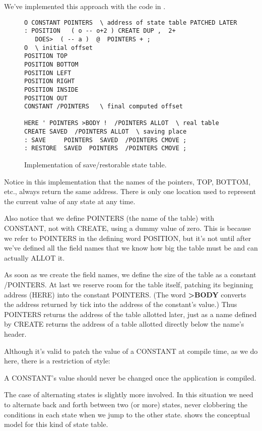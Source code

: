 

We've implemented this approach with the code in .

\begin{figure*}[tttt]
\caption{Implementation of save/restorable state table.}
\begin{center}
\begin{BVerbatim}
O CONSTANT POINTERS  \ address of state table PATCHED LATER
: POSITION   ( o -- o+2 ) CREATE DUP ,  2+
   DOES>  ( -- a )  @  POINTERS + ;
O  \ initial offset
POSITION TOP
POSITION BOTTOM
POSITION LEFT
POSITION RIGHT
POSITION INSIDE
POSITION OUT
CONSTANT /POINTERS   \ final computed offset

HERE ' POINTERS >BODY !  /POINTERS ALLOT  \ real table
CREATE SAVED  /POINTERS ALLOT  \ saving place
: SAVE     POINTERS  SAVED  /POINTERS CMOVE ;
: RESTORE  SAVED  POINTERS  /POINTERS CMOVE ;
\end{BVerbatim}
\end{center}
\end{figure*}

Notice in this implementation that the names of the pointers, TOP,
BOTTOM, etc., always return the same address. There is only one location
used to represent the current value of any state at any time.

Also notice that we define POINTERS (the name of the table) with
CONSTANT, not with CREATE, using a dummy value of zero. This is
because we refer to POINTERS in the defining word POSITION, but it's
not until after we've defined all the field names that we know how big the
table must be and can actually ALLOT it.

As soon as we create the field names, we define the size of the table
as a constant /POINTERS. At last we reserve room for the table itself,
patching its beginning address (HERE) into the constant POINTERS.
(The word \textbf{>BODY} converts the address returned by tick into the
address of the constant's value.) Thus POINTERS returns the address of
the table allotted later, just as a name defined by CREATE returns the
address of a table allotted directly below the name's header.

Although it's valid to patch the value of a CONSTANT at compile
time, as we do here, there is a restriction of style:

\begin{tip}
A CONSTANT's value should never be changed once the application is
compiled.
\end{tip}
The case of alternating states is slightly more involved. In this situation
we need to alternate back and forth between two (or more) states, never
clobbering the conditions in each state when we jump to the other state.
 shows the conceptual model for this kind of state table.

